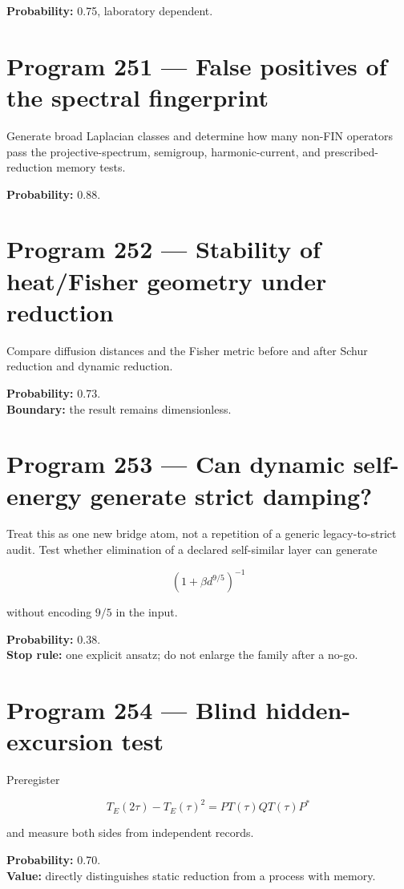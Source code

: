 \documentclass[11pt,a4paper,openany]{report}
\begin{document}
\textbf{Probability:} 0.75, laboratory dependent.

\section{Program 251 --- False positives of the spectral fingerprint}

Generate broad Laplacian classes and determine how many non-FIN operators pass the projective-spectrum, semigroup, harmonic-current, and prescribed-reduction memory tests.

\textbf{Probability:} 0.88.

\section{Program 252 --- Stability of heat/\allowbreak{}Fisher geometry under reduction}

Compare diffusion distances and the Fisher metric before and after Schur reduction and dynamic reduction.

\textbf{Probability:} 0.73.\\
\textbf{Boundary:} the result remains dimensionless.

\section{Program 253 --- Can dynamic self-energy generate strict damping?}

Treat this as one new bridge atom, not a repetition of a generic legacy-to-strict audit. Test whether elimination of a declared self-similar layer can generate

\[
(1+\beta d^{9/5})^{-1}
\]

without encoding \(9/5\) in the input.

\textbf{Probability:} 0.38.\\
\textbf{Stop rule:} one explicit ansatz; do not enlarge the family after a no-go.

\section{Program 254 --- Blind hidden-excursion test}

Preregister

\[
T_E(2\tau)-T_E(\tau)^2
=PT(\tau)QT(\tau)P^\ast
\]

and measure both sides from independent records.

\textbf{Probability:} 0.70.\\
\textbf{Value:} directly distinguishes static reduction from a process with memory.
\end{document}
